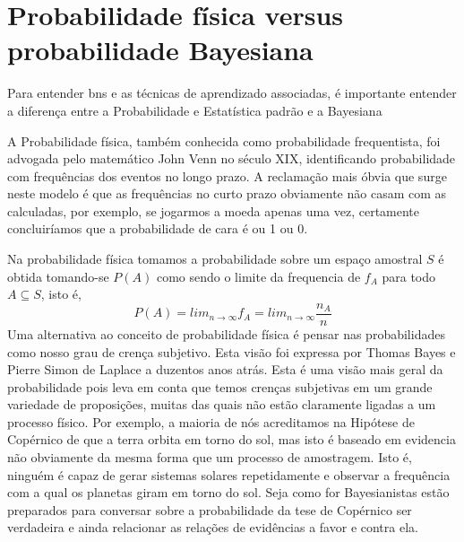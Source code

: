 \section{Probabilidade física versus probabilidade Bayesiana}
Para entender \glspl{bn} e as técnicas de aprendizado associadas, é importante entender a diferença entre a Probabilidade e Estatística padrão e a Bayesiana \cite{korb04}


A Probabilidade física, também conhecida como probabilidade frequentista, foi advogada pelo matemático John Venn \cite{venn66} no século XIX, identificando probabilidade com frequências dos eventos no longo prazo. A reclamação mais óbvia que surge neste modelo é que as frequências no curto prazo obviamente não casam com as calculadas, por exemplo, se jogarmos a moeda apenas uma vez, certamente concluiríamos que a probabilidade de cara é ou 1 ou 0.

Na probabilidade física tomamos a probabilidade sobre um espaço amostral $S$ é obtida tomando-se $P(A)$ como sendo o limite da frequencia de $f_A$ para todo $A \subseteq S$, isto é,
\begin{equation}
P(A) = lim_{n\rightarrow\infty}f_A = lim_{n\rightarrow\infty}\frac{n_A}{n}
\end{equation}
Uma alternativa ao conceito de probabilidade física é pensar nas probabilidades como nosso grau de crença subjetivo. Esta visão foi expressa por Thomas Bayes \cite{bayes63} e Pierre Simon de Laplace \cite{laplace12} a duzentos anos atrás. Esta é uma visão mais geral da probabilidade pois leva em conta que temos crenças subjetivas em um grande variedade de proposições, muitas das quais não estão claramente ligadas a um processo físico.  Por exemplo, a maioria de nós acreditamos na Hipótese de Copérnico de que a terra orbita em torno do sol, mas isto é baseado em evidencia não obviamente da mesma forma que um processo de amostragem. Isto é, ninguém é capaz de gerar sistemas solares repetidamente e observar a frequência com a qual os planetas giram em torno do sol. Seja como for Bayesianistas estão preparados para conversar sobre a probabilidade da tese de Copérnico ser verdadeira e ainda relacionar as relações de evidências a favor e contra ela. 

